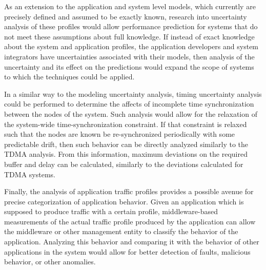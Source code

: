 As an extension to the application and system level models, which
currently are precisely defined and assumed to be exactly known,
research into uncertainty analysis of these profiles would allow
performance prediction for systems that do not meet these assumptions
about full knowledge.  If instead of exact knowledge about the system
and application profiles, the application developers and system
integrators have uncertainties associated with their models, then
analysis of the uncertainty and its effect on the predictions would
expand the scope of systems to which the techniques could be applied.

In a similar way to the modeling uncertainty analysis, timing
uncertainty analysis could be performed to determine the affects of
incomplete time synchronization between the nodes of the system.  Such
analysis would allow for the relaxation of the system-wide
time-synchronization constraint.  If that constraint is relaxed such
that the nodes are known be re-synchronized periodically with some
predictable drift, then such behavior can be directly analyzed
similarly to the TDMA analysis.  From this information, maximum
deviations on the required buffer and delay can be calculated,
similarly to the deviations calculated for TDMA systems.

Finally, the analysis of application traffic profiles provides a
possible avenue for precise categorization of application behavior.
Given an application which is supposed to produce traffic with a
certain profile, middleware-based measurements of the actual traffic
profile produced by the application can allow the middleware or other
management entity to classify the behavior of the application.
Analyzing this behavior and comparing it with the behavior of other
applications in the system would allow for better detection of faults,
malicious behavior, or other anomalies.  
